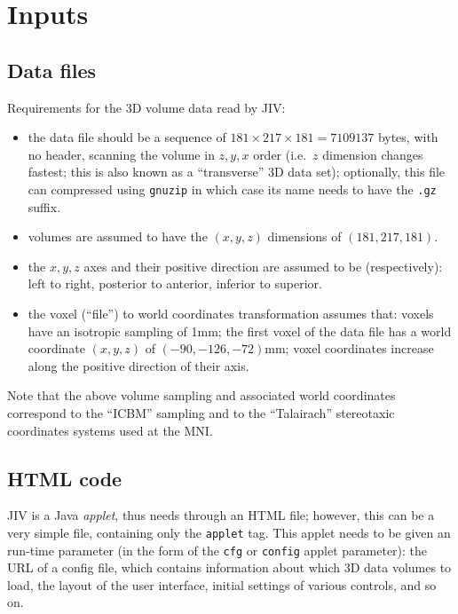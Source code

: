 %
%
%

\section{Inputs}
\label{sec:inputs}


\subsection{Data files}
\label{sec:data-files}
Requirements for the 3D volume data read by JIV:
\begin{itemize}
\item the data file should be a sequence of $181 \times 217 \times 181
  = 7109137$ bytes, with no header, scanning the volume in $z, y, x$
  order (i.e.\ $z$ dimension changes fastest; this is also known as a
  ``transverse'' 3D data set); optionally, this file can compressed
  using \texttt{gnuzip} in which case its name needs to have the
  \texttt{.gz} suffix.
\item volumes are assumed to have the $(x,y,z)$ dimensions of
  $(181,217,181)$.
\item the $x, y, z$ axes and their positive direction are assumed to
  be (respectively): left to right, posterior to anterior, inferior to
  superior.
\item the voxel (``file'') to world coordinates transformation assumes
  that: voxels have an isotropic sampling of 1mm; the first voxel of
  the data file has a world coordinate $(x,y,z)$ of
  \mbox{$(-90,-126,-72)$mm}; voxel coordinates increase along the
  positive direction of their axis.
\end{itemize}

Note that the above volume sampling and associated world coordinates
correspond to the ``ICBM'' sampling and to the ``Talairach''
stereotaxic coordinates systems used at the MNI.  


\subsection{HTML code}
\label{sec:html-code}

JIV is a Java {\em applet}, thus needs through an HTML file; however,
this can be a very simple file, containing only the \verb+applet+ tag.
This applet needs to be given an run-time parameter (in the form of
the \verb+cfg+ or \verb+config+ applet parameter): the URL of a config
file, which contains information about which 3D data volumes to load,
the layout of the user interface, initial settings of various
controls, and so on.

